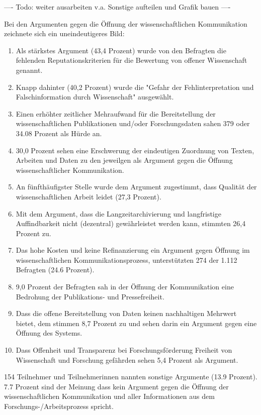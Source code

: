 ---- Todo: weiter ausarbeiten v.a. Sonstige aufteilen und Grafik bauen ----

Bei den Argumenten gegen die Öffnung der wissenschaftlichen Kommunikation zeichnete sich ein uneindeutigeres Bild:
\begin{enumerate}
\item Als stärkstes Argument (43,4 Prozent) wurde von den Befragten die fehlenden Reputationskriterien für die Bewertung von offener Wissenschaft genannt.
\item Knapp dahinter (40,2 Prozent) wurde die "Gefahr der Fehlinterpretation und Falschinformation durch Wissenschaft" ausgewählt.
\item Einen erhöhter zeitlicher Mehraufwand für die Bereitstellung der wissenschaftlichen Publikationen und/oder Forschungsdaten sahen 379 oder 34.08 Prozent als Hürde an.
\item 30,0 Prozent sehen eine Erschwerung der eindeutigen Zuordnung von Texten, Arbeiten und Daten zu den jeweilgen als Argument gegen die Öffnung wissenschaftlicher Kommunikation.
\item  An fünfthäufigster Stelle wurde dem Argument zugestimmt, dass Qualität der wissenschaftlichen Arbeit leidet (27,3 Prozent).
\item Mit dem Argument, dass die Langzeitarchivierung und langfristige Auffindbarkeit nicht (dezentral) gewährleistet werden kann, stimmten 26,4 Prozent zu.
\item Das hohe Kosten und keine Refinanzierung ein Argument gegen Öffnung im wissenschaftlichen Kommunikationsprozess, unterstützten 274 der 1.112 Befragten (24.6 Prozent).
\item 9,0 Prozent der Befragten sah in der Öffnung der Kommunikation eine Bedrohung der Publikations- und Pressefreiheit.
\item Dass die offene Bereitstellung von Daten keinen nachhaltigen Mehrwert bietet, dem stimmen 8,7 Prozent zu und sehen darin ein Argument gegen eine Öffnung des Systems.
\item Dass Offenheit und Transparenz bei Forschungsförderung Freiheit von Wissenschaft und Forschung gefährden sehen 5,4 Prozent als Argument.
\end{enumerate}

154 Teilnehmer und Teilnehmerinnen nannten sonstige Argumente (13.9 Prozent). 7.7 Prozent sind der Meinung dass kein Argument gegen die Öffnung der wissenschaftlichen Kommunikation und aller Informationen aus dem Forschungs-/Arbeitsprozess spricht.

